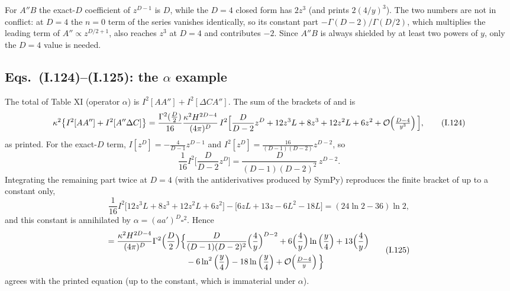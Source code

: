 \begin{notebox}
For $A''B$ the exact-$D$ coefficient of $z^{D-1}$ is $D$, while the $D=4$ closed form has $2z^3$ (and  prints $2(4/y)^3$). The two
numbers are not in conflict: at $D=4$ the $n=0$ term of the series  vanishes identically, so its constant part
$-\Gamma(D-2)/\Gamma(D/2)$, which multiplies the leading term of $A''\propto z^{D/2+1}$, also reaches $z^3$ at $D=4$ and contributes $-2$.
Since $A''B$ is always shielded by at least two powers of $y$, only the $D=4$ value is needed.
\end{notebox}

\subsection{Eqs.~(I.124)--(I.125): the \texorpdfstring{$\alpha$}{alpha} example \texorpdfstring{\tD}{}}
\label{ch6:124-125}

The total of Table XI (operator $\alpha$) is $I^2[AA'']+I^2[\Delta C A'']$. The sum of the brackets of  and  is
\begin{equation}
\kappa^2\big\{I^2[AA'']+I^2[A''\Delta C]\big\}=\frac{\Gamma^2(\frac D2)}{16}\frac{\kappa^2H^{2D-4}}{(4\pi)^D}\,
I^2\Big[\frac{D}{D-2}z^D+12z^3L+8z^3+12z^2L+6z^2+\mathcal{O}\!\left(\tfrac{D-4}{y^3}\right)\Big], \tag{I.124}
\end{equation}
as printed. For the exact-$D$ term, $I[z^D]=-\frac{4}{D-1}z^{D-1}$ and $I^2[z^D]=\frac{16}{(D-1)(D-2)}z^{D-2}$, so
\begin{equation}
\frac1{16}I^2\Big[\frac{D}{D-2}z^D\Big]=\frac{D}{(D-1)(D-2)^2}\,z^{D-2}.
\end{equation}
Integrating the remaining part twice at $D=4$ (with the antiderivatives produced by SymPy) reproduces the finite bracket of  up to a
constant only,
\begin{equation}
\frac1{16}I^2\big[12z^3L+8z^3+12z^2L+6z^2\big]-\Big[6zL+13z-6L^2-18L\Big]=(24\ln2-36)\ln2 ,
\end{equation}
and this constant is annihilated by $\alpha=(aa')^D\square^2$. Hence
\begin{equation}
\begin{split}
=\frac{\kappa^2H^{2D-4}}{(4\pi)^D}\Gamma^2\Big(\frac D2\Big)\Big\{&\frac{D}{(D-1)(D-2)^2}\Big(\frac4y\Big)^{D-2}
+6\Big(\frac4y\Big)\ln\Big(\frac y4\Big)+13\Big(\frac4y\Big)\\
&-6\ln^2\Big(\frac y4\Big)-18\ln\Big(\frac y4\Big)+\mathcal{O}\!\left(\tfrac{D-4}{y}\right)\Big\}
\end{split}\tag{I.125}
\end{equation}
agrees with the printed equation (up to the constant, which is immaterial under $\alpha$).

